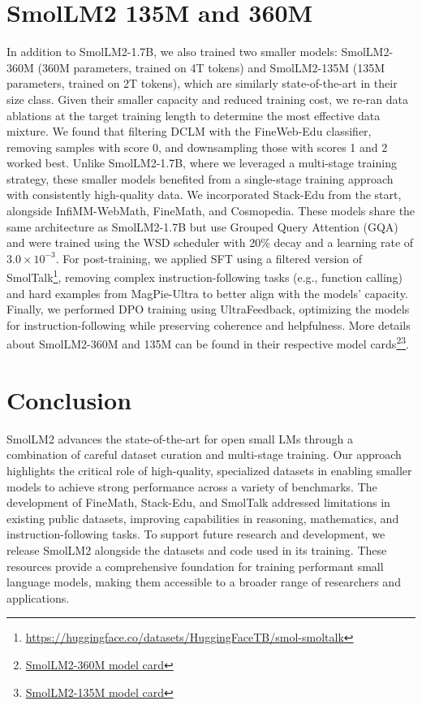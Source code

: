 \documentclass{article}
\theoremstyle{plain}
\theoremstyle{definition}
\theoremstyle{remark}
\begin{document}
\section{SmolLM2 135M and 360M}
In addition to SmolLM2-1.7B, we also trained two smaller models: SmolLM2-360M (360M parameters, trained on 4T tokens) and SmolLM2-135M (135M parameters, trained on 2T tokens), which are similarly state-of-the-art in their size class. Given their smaller capacity and reduced training cost, we re-ran data ablations at the target training length to determine the most effective data mixture. We found that filtering DCLM with the FineWeb-Edu classifier, removing samples with score 0, and downsampling those with scores 1 and 2 worked best. Unlike SmolLM2-1.7B, where we leveraged a multi-stage training strategy, these smaller models benefited from a single-stage training approach with consistently high-quality data. We incorporated Stack-Edu from the start, alongside InfiMM-WebMath, FineMath, and Cosmopedia. These models share the same architecture as SmolLM2-1.7B but use Grouped Query Attention (GQA) and were trained using the WSD scheduler with 20\% decay and a learning rate of $3.0 \times 10^{-3}$. For post-training, we applied SFT using a filtered version of SmolTalk\footnote{\href{https://huggingface.co/datasets/HuggingFaceTB/smol-smoltalk}{https://huggingface.co/datasets/HuggingFaceTB/smol-smoltalk}}, removing complex instruction-following tasks (e.g., function calling) and hard examples from MagPie-Ultra to better align with the models' capacity. Finally, we performed DPO training using UltraFeedback, optimizing the models for instruction-following while preserving coherence and helpfulness. More details about SmolLM2-360M and 135M can be found in their respective model cards\footnote{\href{https://huggingface.co/HuggingFaceTB/SmolLM2-360M-Instruct}{SmolLM2-360M model card}}\footnote{\href{https://huggingface.co/HuggingFaceTB/SmolLM2-135M-Instruct}{SmolLM2-135M model card}}.

\vspace{-0.05cm} 
\section{Conclusion}
\vspace{-0.05cm} 

SmolLM2 advances the state-of-the-art for open small LMs through a combination of careful dataset curation and multi-stage training. Our approach highlights the critical role of high-quality, specialized datasets in enabling smaller models to achieve strong performance across a variety of benchmarks. The development of FineMath, Stack-Edu, and SmolTalk addressed limitations in existing public datasets, improving capabilities in reasoning, mathematics, and instruction-following tasks. To support future research and development, we release SmolLM2 alongside the datasets and code used in its training. These resources provide a comprehensive foundation for training performant small language models, making them accessible to a broader range of researchers and applications.
\end{document}
